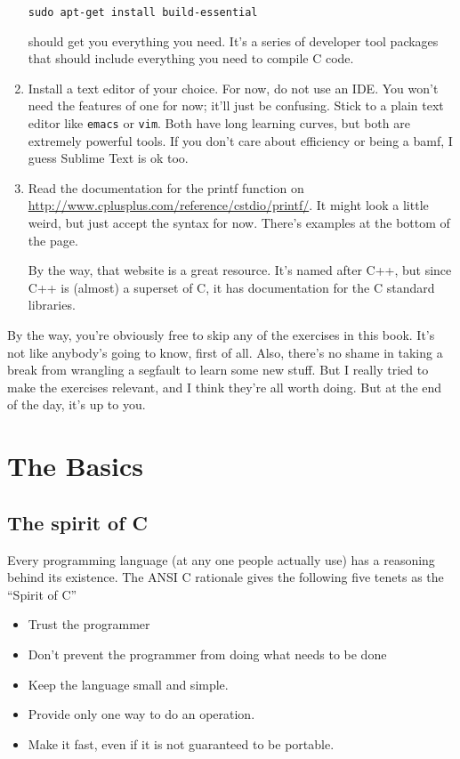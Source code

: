 \documentclass[ebook,11pt,oneside,openany]{memoir}
\begin{document}
\begin{enumerate}
\begin{verbatim}
sudo apt-get install build-essential
\end{verbatim}

should get you everything you need. It's a series of developer tool packages that should include everything you need to compile C code.

\item Install a text editor of your choice. For now, do not use an IDE. You won't need the features of one for now; it'll just be confusing. Stick to a plain text editor like \texttt{emacs} or \texttt{vim}. Both have long learning curves, but both are extremely powerful tools. If you don't care about efficiency or being a bamf, I guess Sublime Text is ok too.

\item Read the documentation for the printf function on \url{http://www.cplusplus.com/reference/cstdio/printf/}. It might look a little weird, but just accept the syntax for now. There's examples at the bottom of the page.

By the way, that website is a great resource. It's named after C++, but since C++ is (almost) a superset of C, it has documentation for the C standard libraries.

\end{enumerate}

By the way, you're obviously free to skip any of the exercises in this book. It's not like anybody's going to know, first of all. Also, there's no shame in taking a break from wrangling a segfault to learn some new stuff. But I really tried to make the exercises relevant, and I think they're all worth doing. But at the end of the day, it's up to you.

\chapter{The Basics}
\label{ch:basic}

\section{The spirit of C}
Every programming language (at any one people actually use) has a reasoning behind its existence. The ANSI C rationale gives the following five tenets as the ``Spirit of C''

\begin{itemize}
\item Trust the programmer
\item Don't prevent the programmer from doing what needs to be done
\item Keep the language small and simple.
\item Provide only one way to do an operation.
\item Make it fast, even if it is not guaranteed to be portable.
\end{itemize}
\end{document}
